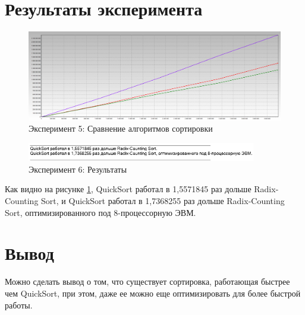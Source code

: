 \section{Результаты эксперимента}
\begin{figure}[ht!]
    \centering
    \includegraphics[width=170mm]{./img/task_06.png}
    \caption{Эксперимент 5: Сравнение алгоритмов сортировки}
\end{figure}

\begin{figure}[ht!]
    \centering
    \includegraphics[width=100mm]{./img/res_06.png}
    \caption{Эксперимент 6: Результаты\label{res_06}}
\end{figure}

Как видно на рисунке \ref{res_06}, QuickSort работал в 1,5571845  раз дольше Radix-Counting Sort, и QuickSort работал в 1,7368255 раз дольше Radix-Counting Sort, оптимизированного под 8-процессорную ЭВМ.

\section{Вывод}
Можно сделать вывод о том, что существует сортировка, работающая быстрее чем QuickSort, при этом, даже ее можно еще оптимизировать для более быстрой работы.